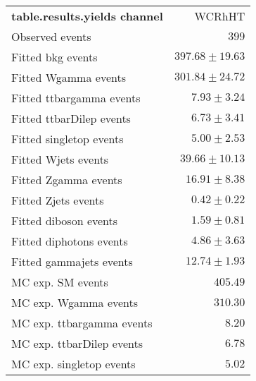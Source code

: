 

\begin{table}
\begin{center}
\setlength{\tabcolsep}{0.0pc}
{\small
\begin{tabular*}{\textwidth}{@{\extracolsep{\fill}}lr}
\noalign{\smallskip}\hline\noalign{\smallskip}
{\bf table.results.yields channel}           & WCRhHT              \\[-0.05cm]
\noalign{\smallskip}\hline\noalign{\smallskip}
Observed events          & $399$                    \\
\noalign{\smallskip}\hline\noalign{\smallskip}
Fitted bkg events         & $397.68 \pm 19.63$              \\
\noalign{\smallskip}\hline\noalign{\smallskip}
        Fitted Wgamma events         & $301.84 \pm 24.72$              \\
        Fitted ttbargamma events         & $7.93 \pm 3.24$              \\
        Fitted ttbarDilep events         & $6.73 \pm 3.41$              \\
        Fitted singletop events         & $5.00 \pm 2.53$              \\
        Fitted Wjets events         & $39.66 \pm 10.13$              \\
        Fitted Zgamma events         & $16.91 \pm 8.38$              \\
        Fitted Zjets events         & $0.42 \pm 0.22$              \\
        Fitted diboson events         & $1.59 \pm 0.81$              \\
        Fitted diphotons events         & $4.86 \pm 3.63$              \\
        Fitted gammajets events         & $12.74 \pm 1.93$              \\
 \noalign{\smallskip}\hline\noalign{\smallskip}
MC exp. SM events              & $405.49$              \\
\noalign{\smallskip}\hline\noalign{\smallskip}
        MC exp. Wgamma events         & $310.30$              \\
        MC exp. ttbargamma events         & $8.20$              \\
        MC exp. ttbarDilep events         & $6.78$              \\
        MC exp. singletop events         & $5.02$              \\

\end{tabular*}}
\end{center}
\end{table}
